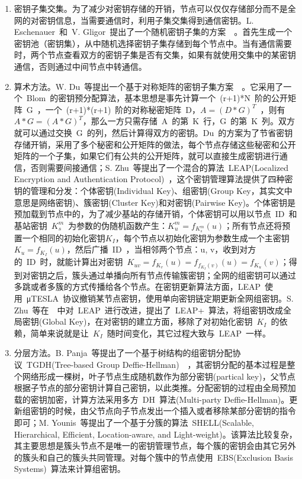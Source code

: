 \documentclass[a4paper,10pt]{article}
\begin{document}
\begin{enumerate}

\item 密钥子集交集。为了减少对密钥存储的开销，节点可以仅仅存储部分而不是全网的对密钥信息，当需要通信时，利用子集交集得到通信密钥。L. Eschenauer~和~V. Gligor~提出了一个随机密钥子集的方案~\cite{Eschenauer2002}~。首先生成一个密钥池（密钥集），从中随机选择密钥子集存储到每个节点中。当有通信需要时，两个节点查看双方的密钥子集是否有交集，如果有就使用交集中的某密钥通信，否则通过中间节点中转通信。

\item 算术方法。W. Du~等提出一个基于对称矩阵的密钥子集方案~\cite{Du2003, Du2005}~。它采用了一个~Blom~的密钥预分配算法，基本思想是事先计算一个~(r+1)*N~阶的公开矩阵~G~，一个~(r+1)*(r+1)~阶的对称秘密矩阵~D，$A=(D*G)^T$~，则有~$A*G=(A*G)^T$，那么一方只需存储~A~的第~K~行，G~的第~K~列。双方就可以通过交换~G~的列，然后计算得双方的密钥。Du~的方案为了节省密钥存储开销，采用了多个秘密和公开矩阵的做法，每个节点存储这些秘密和公开矩阵的一个子集，如果它们有公共的公开矩阵，就可以直接生成密钥进行通信，否则需要间接通信；S. Zhu~等提出了一个混合的算法~LEAP(Localized Encryption and Authentication Protocol)\cite{Zhu2003}~，这个密钥管理算法提供了四种密钥的管理和分发：个体密钥(Individual Key)、组密钥(Group Key，其实文中意思是网络密钥)、簇密钥(Cluster Key)和对密钥(Pairwise Key)。个体密钥是预加载到节点中的，为了减少基站的存储开销，个体密钥可以用以节点~ID~和基站密钥~$K^m_s$~为参数的伪随机函数产生：$K^m_u=f_{K^m_s}(u)$；所有节点还将预置一个相同的初始化密钥$K_I$，每个节点以初始化密钥为参数生成一个主密钥$K_u=f_{K_I}(u)$，然后广播~ID~，当相邻两个节点：u, v，收到对方的~ID~时，就能计算出对密钥~$K_{uv}=f_{K_v}(u)=f_{f_{K_I}(v)}(u)=f_{K_u}(v)$；得到对密钥之后，簇头通过单播向所有节点传输簇密钥；全网的组密钥可以通过多跳或者多簇的方式传播给各个节点。在密钥更新算法方面，LEAP~使用~μTESLA~协议撤销某节点密钥，使用单向密钥链定期更新全网组密钥。S. Zhu~等在~\cite{Zhu2006}~中对~LEAP~进行改进，提出了~LEAP+~算法，将组密钥改成全局密钥(Global Key)，在对密钥的建立方面，移除了对初始化密钥~$K_I$~的依赖，简单来说就是让~$K_I$~随时间变化，其它过程大致与~LEAP~一样。

\item 分层方法。B. Panja~等提出了一个基于树结构的组密钥分配协议~TGDH(Tree-based Group Deffie-Hellman)~\cite{Panja2006}~，其密钥分配的基本过程是整个网络形成一棵树，叶子节点生成随机数作为部分密钥(partical key)，父节点根据子节点的部分密钥计算自己密钥，以此类推。分配密钥的过程由全局预加载的密钥加密，计算方法采用多方~DH~算法(Multi-party Deffie-Hellman)。更新组密钥的时候，由父节点向子节点发出一个插入或者移除某部分密钥的指令即可；M. Younis~等提出了一个基于分簇的算法~SHELL(Scalable, Hierarchical, Efficient, Location-aware, and Light-weight)\cite{Younis2006}。该算法比较复杂，其主要思想是簇头节点不是唯一的密钥管理节点，每个簇的密钥会由其它另外的簇头和自己的簇头共同管理。对每个簇中的节点使用~EBS(Exclusion Basis Systems)~算法来计算组密钥。

\end{enumerate}
\end{document}
